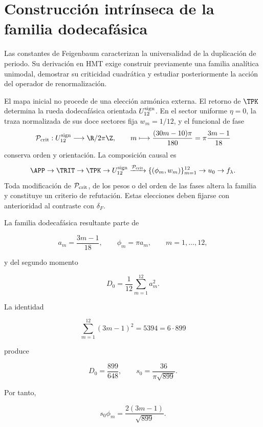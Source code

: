 \label{mab:rm:ch:chaos}

\section{Construcci\'on intr\'inseca de la familia dodecaf\'asica}

Las constantes de Feigenbaum caracterizan la universalidad de la
duplicaci\'on de periodo. Su derivaci\'on en HMT exige construir previamente
una familia anal\'itica unimodal, demostrar su criticidad cuadr\'atica y
estudiar posteriormente la acci\'on del operador de renormalizaci\'on.

El mapa inicial no procede de una elecci\'on arm\'onica externa. El retorno
de \(\TPK\) determina la rueda dodecaf\'asica orientada
\(U_{12}^{\rm sign}\). En el sector uniforme \(\eta=0\), la traza
normalizada de sus doce sectores fija \(w_m=1/12\), y el funcional de fase
\begin{equation}
\mathcal P_{\rm crit}:U_{12}^{\rm sign}\longrightarrow\R/2\pi\Z,
\qquad
m\longmapsto \frac{(30m-10)\pi}{180}
=\pi\frac{3m-1}{18}
\label{mab:rm:eq:critical-phase-reader}
\end{equation}
conserva orden y orientaci\'on. La composici\'on causal es
\[
\APP\to\TRIT\to\TPK\to U_{12}^{\rm sign}
\xrightarrow{\mathcal P_{\rm crit}}
\{(\phi_m,w_m)\}_{m=1}^{12}
\to u_0\to f_\lambda.
\]
Toda modificaci\'on de \(\mathcal P_{\rm crit}\), de los pesos o del orden de
las fases altera la familia y constituye un criterio de refutaci\'on. Estas
elecciones deben fijarse con anterioridad al contraste con \(\delta_F\).

La familia dodecaf\'asica resultante parte de

\[
a_m=\frac{3m-1}{18},\qquad
\phi_m=\pi a_m,\qquad m=1,\ldots,12,
\]

y del segundo momento

\[
D_0=\frac1{12}\sum_{m=1}^{12}a_m^2.
\]

La identidad

\begin{equation}
\sum_{m=1}^{12}(3m-1)^2=5394=6\cdot899
\label{mab:rm:eq:chaos-sum2}
\end{equation}

produce

\[
D_0=\frac{899}{648},\qquad
s_0=\frac{36}{\pi\sqrt{899}}.
\]

Por tanto,

\begin{equation}
s_0\phi_m=\frac{2(3m-1)}{\sqrt{899}}.
\label{mab:rm:eq:pi-cancellation}
\end{equation}

